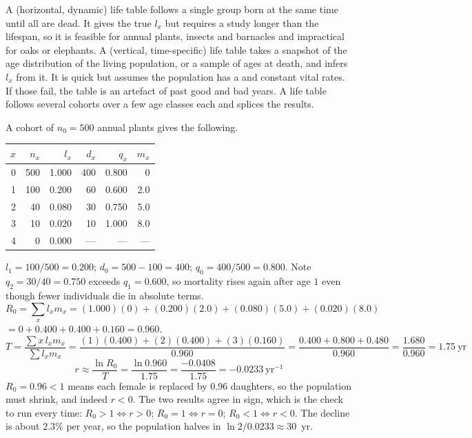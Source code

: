 \begin{defbox}[title={DEFINITIONS: cohort, static and segment life tables}]
A  (horizontal, dynamic) life table follows a single group born at the
same time until all are dead. It gives the true $l_x$ but requires a study longer
than the lifespan, so it is feasible for annual plants, insects and barnacles and
impractical for oaks or elephants.
A  (vertical, time-specific) life table takes a snapshot of the age
distribution of the living population, or a sample of ages at death, and infers
$l_x$ from it. It is quick but assumes the population has a  and constant vital rates. If those fail, the table is an artefact
of past good and bad years.
A  life table follows several cohorts over a few age classes each and
splices the results.
\end{defbox}

\begin{calcbox}[title={WORKED: completing a life table and computing $R_0$}]
A cohort of $n_0=500$ annual plants gives the following.

\begin{tabular}{@{}rrrrrr@{}}
\toprule
$x$ & $n_x$ & $l_x$ & $d_x$ & $q_x$ & $m_x$\\
\midrule
0 & 500 & 1.000 & 400 & 0.800 & 0\\
1 & 100 & 0.200 & 60 & 0.600 & 2.0\\
2 & 40 & 0.080 & 30 & 0.750 & 5.0\\
3 & 10 & 0.020 & 10 & 1.000 & 8.0\\
4 & 0 & 0.000 & --- & --- & ---\\
\bottomrule
\end{tabular}

 $l_1=100/500=0.200$; $d_0=500-100=400$;
$q_0=400/500=0.800$. Note $q_2=30/40=0.750$ exceeds $q_1=0.600$, so mortality
rises again after age $1$ even though fewer individuals die in absolute terms.
\[
R_0=\sum_x l_x m_x = (1.000)(0)+(0.200)(2.0)+(0.080)(5.0)+(0.020)(8.0)
\]
$=0+0.400+0.400+0.160=0.960$.
\[
T=\frac{\sum x\, l_x m_x}{\sum l_x m_x}
=\frac{(1)(0.400)+(2)(0.400)+(3)(0.160)}{0.960}
=\frac{0.400+0.800+0.480}{0.960}=\frac{1.680}{0.960}=1.75\ \text{yr}
\]
\[
r\approx\frac{\ln R_0}{T}=\frac{\ln 0.960}{1.75}=\frac{-0.0408}{1.75}
=-0.0233\ \mathrm{yr^{-1}}
\]
 $R_0=0.96<1$ means each female is replaced by $0.96$ daughters,
so the population must shrink, and indeed $r<0$. The two results agree in sign,
which is the check to run every time: $R_0>1\Leftrightarrow r>0$;
$R_0=1\Leftrightarrow r=0$; $R_0<1\Leftrightarrow r<0$. The decline is about
$2.3\%$ per year, so the population halves in
$\ln 2/0.0233\approx 30$~yr. \tm{$\surd$}
\end{calcbox}

